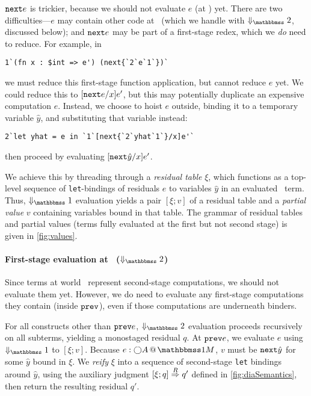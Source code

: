 \begin{abstrsyn}
${\tt next}{e}$ is trickier, because we should not evaluate $e$ (at \bbtwo) yet.
There are two difficulties---$e$ may contain other code at \bbonem\ (which we
handle with $\redtwosym$, discussed below); and ${\tt next}{e}$ may be part of a
first-stage redex, which we \emph{do} need to reduce. For example, in
\begin{lstlisting} 
1`(fn x : $int => e') (next{`2`e`1`})`
\end{lstlisting}
we must reduce this first-stage function application, but cannot reduce $e$ yet.
We could reduce this to $[{\tt next}{e}/x]e'$, but this may potentially duplicate an
expensive computation $e$. Instead, we choose to hoist $e$ outside, binding it
to a temporary variable $\hat{y}$, and substituting that variable instead:
\begin{lstlisting} 
2`let yhat = e in `1`[next{`2`yhat`1`}/x]e'`
\end{lstlisting}
then proceed by evaluating $[{\tt next}{\hat{y}}/x]e'$.

We achieve this by threading through a \emph{residual table} $\xi$, which
functions as a top-level sequence of \texttt{let}-bindings of residuals $e$ to
variables $\hat{y}$ in an evaluated \bbonem\ term. Thus, $\redonesym$ evaluation
yields a pair $[\xi;v]$ of a residual table and a \emph{partial value} $v$
containing variables bound in that table. The grammar of residual tables and
partial values (terms fully evaluated at the first but not second stage) is
given in \ref{fig:values}.


\paragraph{First-stage evaluation at \bbtwo\ ($\redtwosym$)}
Since terms at world \bbtwo\ represent second-stage computations, we should not
evaluate them yet. However, we do need to evaluate any first-stage computations
they contain (inside ${\tt prev}$), even if those computations are underneath
binders.

For all constructs other than ${\tt prev}{e}$, $\redtwosym$ evaluation proceeds
recursively on all subterms, yielding a monostaged residual $q$. At ${\tt prev}{e}$,
we evaluate $e$ using $\redonesym$ to $[\xi;v]$. Because $\colmix e{\fut A}$,
$v$ must be ${\tt next}{\hat{y}}$ for some $\hat{y}$ bound in $\xi$. We \emph{reify}
$\xi$ into a sequence of second-stage \texttt{let} bindings around $\hat{y}$,
using the auxiliary judgment $[{\xi};{q}]\overset{R}\Rightarrow{q'}$ defined in
\ref{fig:diaSemantics}, then return the resulting residual $q'$.

\end{abstrsyn}

